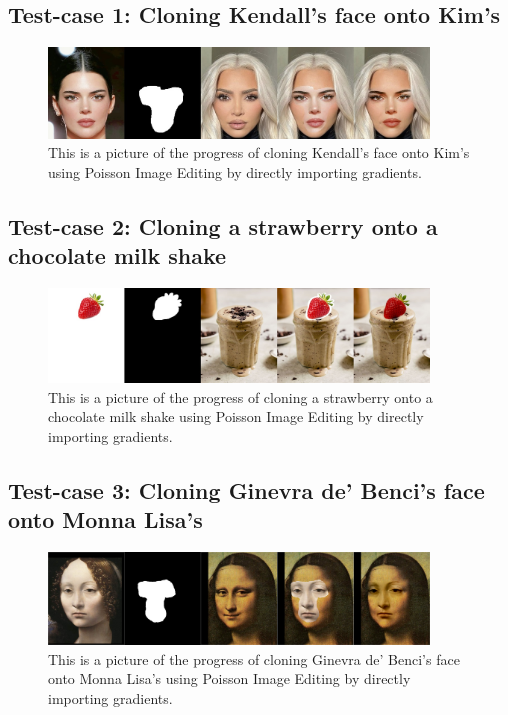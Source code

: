 \documentclass[10pt, a4paper]{article}%
\begin{document}
 \subsection{Test-case 1: Cloning Kendall's face onto Kim's }
 \begin{figure}[H]
     \centering
     \includegraphics[width=0.9\textwidth]{progress_import_Kardashian.jpg}
     \caption{This is a picture of the progress of cloning Kendall's face onto Kim's using Poisson Image Editing by directly importing gradients.}
     \label{fig:my_label}
 \end{figure}
 \subsection{Test-case 2: Cloning a strawberry onto a chocolate milk shake }
 \begin{figure}[H]
     \centering
     \includegraphics[width=0.9\textwidth]{progress_import_strawberry Milk Shake.jpg}
     \caption{This is a picture of the progress of cloning a strawberry onto a chocolate milk shake using Poisson Image Editing by directly importing gradients.}
     \label{fig:my_label}
 \end{figure}
 \subsection{Test-case 3: Cloning Ginevra de' Benci's face onto Monna Lisa’s}
 \begin{figure}[H]
     \centering
     \includegraphics[width=0.9\textwidth]{progress_import_monna.png}
     \caption{This is a picture of the progress of cloning Ginevra de' Benci's face onto Monna Lisa's using Poisson Image Editing by directly importing gradients.}
     \label{fig:my_label}
 \end{figure}
\end{document}
